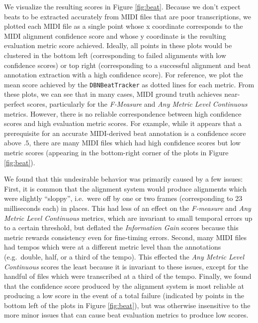 \documentclass{article}
\begin{document}
We visualize the resulting scores in Figure \ref{fig:beat}.
Because we don't expect beats to be extracted accurately from MIDI files that are poor transcriptions, we plotted each MIDI file as a single point whose x coordinate corresponds to the MIDI alignment confidence score and whose y coordinate is the resulting evaluation metric score achieved.
Ideally, all points in these plots would be clustered in the bottom left (corresponding to failed alignments with low confidence scores) or top right (corresponding to a successful alignment and beat annotation extraction with a high confidence score).
For reference, we plot the mean score achieved by the \texttt{DBNBeatTracker} as dotted lines for each metric.
From these plots, we can see that in many cases, MIDI ground truth achieves near-perfect scores, particularly for the {\em F-Measure} and {\em Any Metric Level Continuous} metrics.
However, there is no reliable correspondence between high confidence scores and high evaluation metric scores.
For example, while it appears that a prerequisite for an accurate MIDI-derived beat annotation is a confidence score above $.5$, there are many MIDI files which had high confidence scores but low metric scores (appearing in the bottom-right corner of the plots in Figure \ref{fig:beat}).

We found that this undesirable behavior was primarily caused by a few issues:
First, it is common that the alignment system would produce alignments which were slightly ``sloppy'', i.e.\ were off by one or two frames (corresponding to 23 milliseconds each) in places.
This had less of an effect on the {\em F-measure} and {\em Any Metric Level Continuous} metrics, which are invariant to small temporal errors up to a certain threshold, but deflated the {\em Information Gain} scores because this metric rewards consistency even for fine-timing errors.
Second, many MIDI files had tempos which were at a different metric level than the annotations (e.g.\ double, half, or a third of the tempo).
This effected the {\em Any Metric Level Continuous} scores the least because it is invariant to these issues, except for the handful of files which were transcribed at a third of the tempo.
Finally, we found that the confidence score produced by the alignment system is most reliable at producing a low score in the event of a total failure (indicated by points in the bottom left of the plots in Figure \ref{fig:beat}), but was otherwise insensitive to the more minor issues that can cause beat evaluation metrics to produce low scores.
\end{document}
